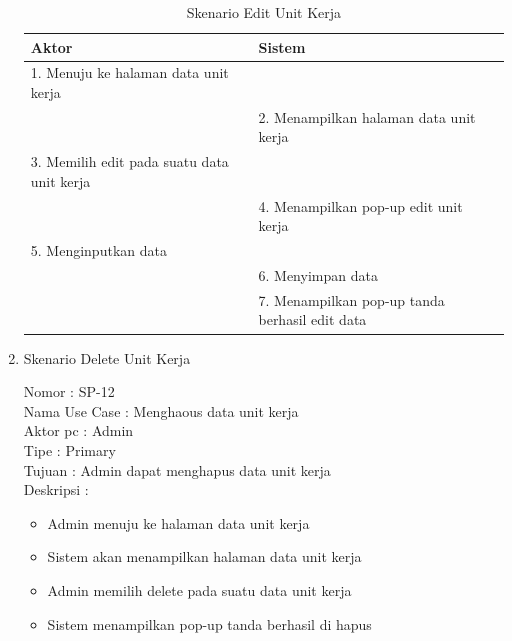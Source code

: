 \begin{enumerate}
\begin{itemize}
\end{itemize}

\begin{table}
	\caption{Skenario Edit Unit Kerja}
	\centering
	\begin{tabular}{ | p{55mm} | p{70mm} |}
		\hline 
		\textbf{Aktor} & \textbf{Sistem} \\
		\hline
		
		1.	Menuju ke halaman data unit kerja &  \\
		
		\hline
		
		&  2.	Menampilkan halaman data unit kerja \\
		
		\hline
		
		3. Memilih edit pada suatu data unit kerja & \\
		
		\hline
		
		& 4.	Menampilkan pop-up edit unit kerja \\
		
		\hline
		
		5.	Menginputkan data  & \\
		\hline
		
		& 6.	Menyimpan data \\
		\hline
		
		& 7.	Menampilkan pop-up tanda berhasil edit data \\
		\hline
		
	\end{tabular}
\end{table}

\item Skenario Delete Unit Kerja

Nomor \kern 3.6pc : SP-12 \\
Nama Use Case : Menghaous data unit kerja \\
Aktor  pc : Admin \\
Tipe \kern 4.6pc : Primary \\
Tujuan \kern 3.6pc : Admin dapat menghapus data unit kerja \\
Deskripsi \kern 2.5pc : 

\begin{itemize}
	\item Admin menuju ke halaman data unit kerja
	\item Sistem akan menampilkan halaman data unit kerja
	\item Admin memilih delete pada suatu data unit kerja
	\item Sistem menampilkan pop-up tanda berhasil di hapus
	

\end{itemize}
\end{enumerate}
